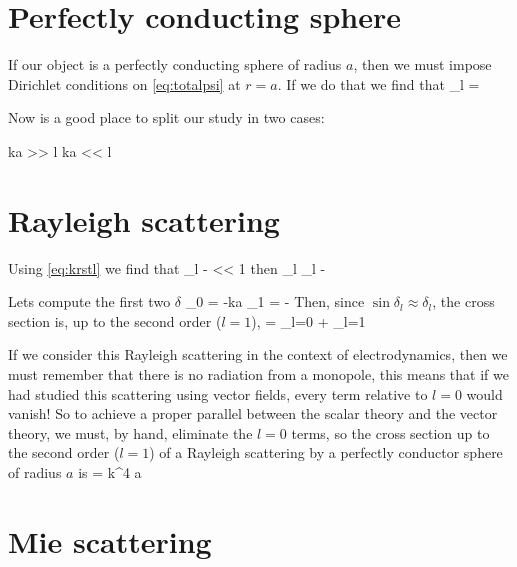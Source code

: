 \documentclass[oneside, 12pt, notitlepage]{book}
\begin{document}
\section{Perfectly conducting sphere}

If our object is a perfectly conducting sphere of radius \(a\), then we must impose Dirichlet conditions on \eqref{eq:totalpsi} at \(r=a\). If we do that we find that
\beq[] \tan\delta_l =  \eeq\par

Now is a good place to split our study in two cases:
\begin{tcolorbox}
\beq[]  ka >> l \qq{} \rightarrow {} \eeq
\beq[]  ka << l \qq{} \rightarrow {} \eeq
\end{tcolorbox}

\section{Rayleigh scattering}

Using \eqref{eq:krstl} we find that
\beq[] \tan\delta_l \approx -  << 1 \eeq
then
\beq[] \tan\delta_l \approx \delta_l \approx -  \eeq\par

Lets compute the first two \(\delta\)
\beq[] \delta_0 = -ka \qcomma \delta_1 = - \eeq
Then, since \(\sin \delta_l \approx \delta_l\), the cross section is, up to the second order (\(l=1\)),
\beq[] \sigma = _{l=0} + _{l=1} \eeq\par

If we consider this Rayleigh scattering in the context of electrodynamics, then we must remember that there is no radiation from a monopole, this means that if we had studied this scattering using vector fields, every term relative to \(l=0\) would vanish! So to achieve a proper parallel between the scalar theory and the vector theory, we must, by hand, eliminate the \(l=0\) terms, so the cross section up to the second order (\(l=1\)) of a Rayleigh scattering by a perfectly conductor sphere of radius \(a\) is
\beq[] \sigma = k^4 a \eeq

\section{Mie scattering}
\end{document}
